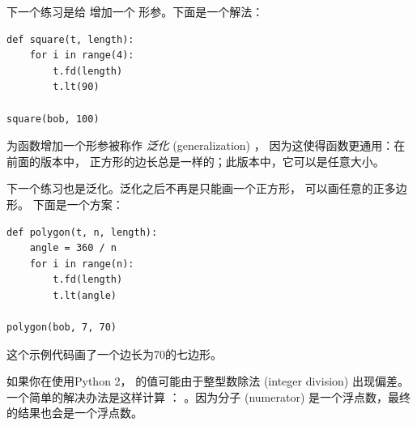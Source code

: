 下一个练习是给  增加一个  形参。下面是一个解法：

\begin{lstlisting}
def square(t, length):
    for i in range(4):
        t.fd(length)
        t.lt(90)

square(bob, 100)
\end{lstlisting}

%

为函数增加一个形参被称作 \emph{泛化} (generalization) ，
因为这使得函数更通用：在前面的版本中，
正方形的边长总是一样的；此版本中，它可以是任意大小。


下一个练习也是泛化。泛化之后不再是只能画一个正方形， 可以画任意的正多边形。 下面是一个方案：

\begin{lstlisting}
def polygon(t, n, length):
    angle = 360 / n
    for i in range(n):
        t.fd(length)
        t.lt(angle)

polygon(bob, 7, 70)
\end{lstlisting}


这个示例代码画了一个边长为70的七边形。


如果你在使用Python 2， 的值可能由于整型数除法 (integer division) 出现偏差。一个简单的解决办法是这样计算  ：  。因为分子 (numerator) 是一个浮点数，最终的结果也会是一个浮点数。


